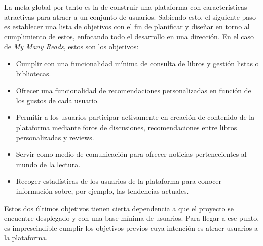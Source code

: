 La meta global por tanto es la de construir una plataforma con características atractivas para atraer a un conjunto de usuarios. Sabiendo esto, el siguiente paso es establecer una lista de objetivos con el fin de planificar y diseñar en torno al cumplimiento de estos, enfocando todo el desarrollo en una dirección. En el caso de \textit{My Many Reads}, estos son los objetivos:

\begin{itemize}
    \item Cumplir con una funcionalidad mínima de consulta de libros y gestión listas o bibliotecas.
    \item Ofrecer una funcionalidad de recomendaciones personalizadas en función de los gustos de cada usuario.
    \item Permitir a los usuarios participar activamente en creación de contenido de la plataforma mediante foros de discusiones, recomendaciones entre libros personalizadas y reviews.
    \item Servir como medio de comunicación para ofrecer noticias pertenecientes al mundo de la lectura.
    \item Recoger estadísticas de los usuarios de la plataforma para conocer información sobre, por ejemplo, las tendencias actuales.
\end{itemize}

Estos dos últimos objetivos tienen cierta dependencia a que el proyecto se encuentre desplegado y con una base mínima de usuarios. Para llegar a ese punto, es imprescindible cumplir los objetivos previos cuya intención es atraer usuarios a la plataforma.
